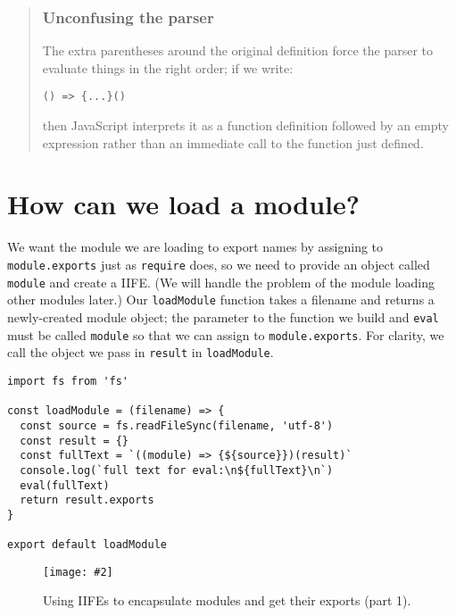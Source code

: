 \documentclass[krantzl]{krantz}
\newcommand{\figpdf}[4]{\begin{figure}%
\centering%
\texttt{[image: \#2]}%
\caption{#3}%
\label{#1}%
\end{figure}}
\newenvironment{callout}{\savenotes\begin{tBox}\begin{quotation}\toggletrue{inbox}\renewcommand{\thempfootnote}{\arabic{footnote}}}{\end{quotation}\vspace{\baselineskip}\end{tBox}\togglefalse{inbox}\spewnotes}
\begin{document}
\begin{callout}


\subsubsection*{Unconfusing the parser}


The extra parentheses around the original definition force the parser to evaluate things in the right order;
if we write:

\begin{lstlisting}[frame=single,frameround=tttt]
() => {...}()
\end{lstlisting}


\noindent then JavaScript interprets it as a function definition followed by an empty expression
rather than an immediate call to the function just defined.

\end{callout}

\section{How can we load a module?}\label{module-loader-load}


We want the module we are loading to export names by assigning to \texttt{module.exports} just as \texttt{require} does,
so we need to provide an object called \texttt{module} and create a IIFE.
(We will handle the problem of the module loading other modules later.)
Our \texttt{loadModule} function takes a filename and returns a newly-created module object;
the parameter to the function we build and \texttt{eval} must be called \texttt{module} so that we can assign to \texttt{module.exports}.
For clarity,
we call the object we pass in \texttt{result} in \texttt{loadModule}.


\begin{lstlisting}[frame=single,frameround=tttt]
import fs from 'fs'

const loadModule = (filename) => {
  const source = fs.readFileSync(filename, 'utf-8')
  const result = {}
  const fullText = `((module) => {${source}})(result)`
  console.log(`full text for eval:\n${fullText}\n`)
  eval(fullText)
  return result.exports
}

export default loadModule
\end{lstlisting}


\figpdf{module-loader-iife-a}{./module-loader/iife-a.pdf}{Using IIFEs to encapsulate modules and get their exports (part 1).}{0.6}
\end{document}
